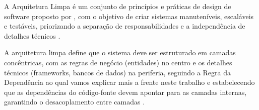         \par A Arquitetura Limpa é um conjunto de princípios e práticas de design de software proposto por \cite{livro:martin:cleanarch}, com o objetivo de criar sistemas manuteníveis, escaláveis e testáveis, priorizando a separação de responsabilidades e a independência de detalhes técnicos \cite{livro:martin:cleanarch}.

        \par A arquitetura limpa define que o sistema deve ser estruturado em camadas concêntricas, com as regras de negócio (entidades) no centro e os detalhes técnicos (frameworks, bancos de dados) na periferia, seguindo a Regra da Dependência ao qual vamos explicar mais a frente neste trabalho e estabelecendo que as dependências do código-fonte devem apontar para as camadas internas, garantindo o desacoplamento entre camadas \cite{livro:martin:cleanarch}.
                
   